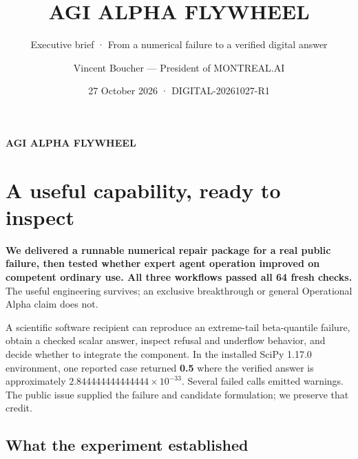 \documentclass[
  10pt,
]{article}
\title{AGI ALPHA FLYWHEEL}
\subtitle{Executive brief · From a numerical failure to a verified
digital answer}
\author{Vincent Boucher --- President of MONTREAL.AI}
\date{27 October 2026 · DIGITAL-20261027-R1}
\begin{document}
\renewcommand{\maketitle}{\begin{center}{\sffamily\Large\bfseries\color{DeepPurple}AGI ALPHA FLYWHEEL\par}\vspace{4pt}{\sffamily Executive brief | From a numerical failure to a verified digital answer\par}\vspace{5pt}{\small Vincent Boucher --- President of MONTREAL.AI\par 27 October 2026 | DIGITAL-20261027-R1}\end{center}\vspace{5pt}}
\maketitle

\hypertarget{a-useful-capability-ready-to-inspect}{%
\section{A useful capability, ready to
inspect}\label{a-useful-capability-ready-to-inspect}}

\textbf{We delivered a runnable numerical repair package for a real
public failure, then tested whether expert agent operation improved on
competent ordinary use. All three workflows passed all 64 fresh checks.}
The useful engineering survives; an exclusive breakthrough or general
Operational Alpha claim does not.

A scientific software recipient can reproduce an extreme-tail
beta-quantile failure, obtain a checked scalar answer, inspect refusal
and underflow behavior, and decide whether to integrate the component.
In the installed SciPy 1.17.0 environment, one reported case returned
\textbf{0.5} where the verified answer is approximately
\textbf{\(2.844444444444444\times10^{-33}\)}. Several failed calls
emitted warnings. The public issue supplied the failure and candidate
formulation; we preserve that credit.

\hypertarget{what-the-experiment-established}{%
\subsection{What the experiment
established}\label{what-the-experiment-established}}
\end{document}
